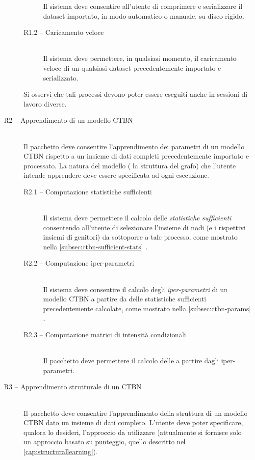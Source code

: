 \begin{description}
\begin{description}
		Il sistema deve consentire all'utente di comprimere e serializzare il dataset importato, in modo automatico o manuale, su disco rigido.
		\item[R1.2 -- Caricamento veloce] \hfill \\
		Il sistema deve permettere, in qualsiasi momento, il caricamento veloce di un qualsiasi dataset precedentemente importato e serializzato.
		\end{description}
		Si osservi che tali processi devono poter essere eseguiti anche in sessioni di lavoro diverse.
	\item[R2 -- Apprendimento di un modello CTBN] \hfill \\
	Il pacchetto deve consentire l'apprendimento dei parametri di un modello \acs{CTBN} rispetto a un insieme di dati completi precedentemente importato e processato. La natura del modello (\ie{} la struttura del grafo) che l'utente intende apprendere deve essere specificata ad ogni esecuzione.
		\begin{description}
		\item[R2.1 -- Computazione statistiche sufficienti] \hfill \\
		Il sistema deve permettere il calcolo delle \emph{statistiche sufficienti} consentendo all'utente di selezionare l'insieme di nodi (e i rispettivi insiemi di genitori) da sottoporre a tale processo, come mostrato nella \autoref{subsec:ctbn-sufficient-stats} .
		\item[R2.2 -- Computazione iper-parametri] \hfill \\
		Il sistema deve consentire il calcolo degli \emph{iper-parametri} di un modello \acs{CTBN} a partire da delle statistiche sufficienti precedentemente calcolate, come mostrato nella \autoref{subsec:ctbn-params} .
		\item[R2.3 -- Computazione matrici di intensità condizionali] \hfill \\
		Il pacchetto deve permettere il calcolo delle \emph{\im{}} a partire dagli iper-parametri.
		\end{description}
	\item[R3 -- Apprendimento strutturale di un CTBN] \hfill \\
	Il pacchetto deve consentire l'apprendimento della struttura di un modello \acs{CTBN} dato un insieme di dati completo. L'utente deve poter specificare, qualora lo desideri, l'approccio da utilizzare (attualmente si fornisce solo un approccio basato su punteggio, quello descritto nel \vref{cap:structurallearning}).

\end{description}
